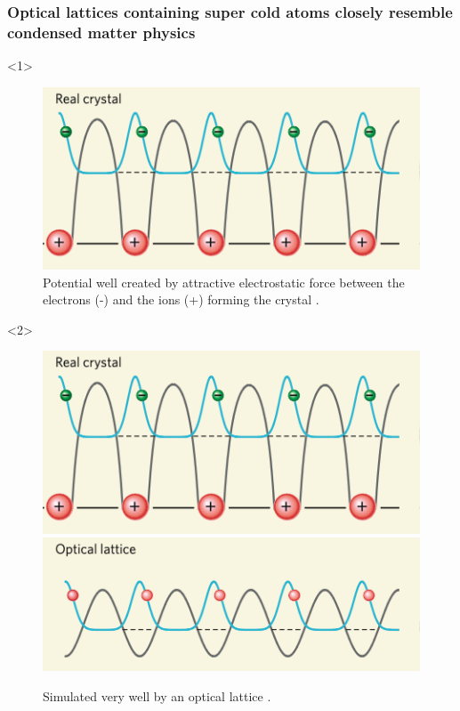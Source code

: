 \documentclass[aspectratio=169]{beamer}
\begin{document}
\begin{frame}
  \frametitle{Optical lattices containing super cold atoms closely resemble condensed matter physics
  }
  \begin{onlyenv}<1>
    \begin{figure}
      \includegraphics[scale=0.4]{../img/real-crystal.png}
      \caption{Potential well created by attractive electrostatic force between the electrons (-) and the ions (+) forming the crystal \footnotemark[1].}
    \end{figure}
  \end{onlyenv}
  \begin{onlyenv}<2>
    \begin{figure}
      \includegraphics[scale=0.4]{../img/real-crystal.png} \\
      \includegraphics[scale=0.4]{../img/lattice.png}
      \caption{Simulated very well by an optical lattice \footnotemark[1].}
    \end{figure}
  \end{onlyenv}
\end{frame}
\end{document}
